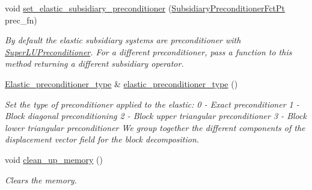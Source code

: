 \begin{DoxyCompactItemize}
void \hyperlink{classoomph_1_1PseudoElasticPreconditionerOld_aae1c5f984fee69fca7cd9719ed2222a4}{set\+\_\+elastic\+\_\+subsidiary\+\_\+preconditioner} (\hyperlink{classoomph_1_1PseudoElasticPreconditionerOld_a8ee80a4a55139190a6e2a16fa175e75f}{Subsidiary\+Preconditioner\+Fct\+Pt} prec\+\_\+fn)
\begin{DoxyCompactList}\small\item\em By default the elastic subsidiary systems are preconditioner with \hyperlink{classoomph_1_1SuperLUPreconditioner}{Super\+L\+U\+Preconditioner}. For a different preconditioner, pass a function to this method returning a different subsidiary operator. \end{DoxyCompactList}\item 
\hyperlink{classoomph_1_1PseudoElasticPreconditionerOld_a6748360e3e2fbd4766d837a520dadfd0}{Elastic\+\_\+preconditioner\+\_\+type} \& \hyperlink{classoomph_1_1PseudoElasticPreconditionerOld_a9edf6f556251ea6ca1b15baf3f6b0425}{elastic\+\_\+preconditioner\+\_\+type} ()
\begin{DoxyCompactList}\small\item\em Set the type of preconditioner applied to the elastic\+: 0 -\/ Exact preconditioner 1 -\/ Block diagonal preconditioning 2 -\/ Block upper triangular preconditioner 3 -\/ Block lower triangular preconditioner We group together the different components of the displacement vector field for the block decomposition. \end{DoxyCompactList}\item 
void \hyperlink{classoomph_1_1PseudoElasticPreconditionerOld_acadd6682a6d25534d7e2be1e95c4d0e6}{clean\+\_\+up\+\_\+memory} ()
\begin{DoxyCompactList}\small\item\em Clears the memory. \end{DoxyCompactList}\end{DoxyCompactItemize}
